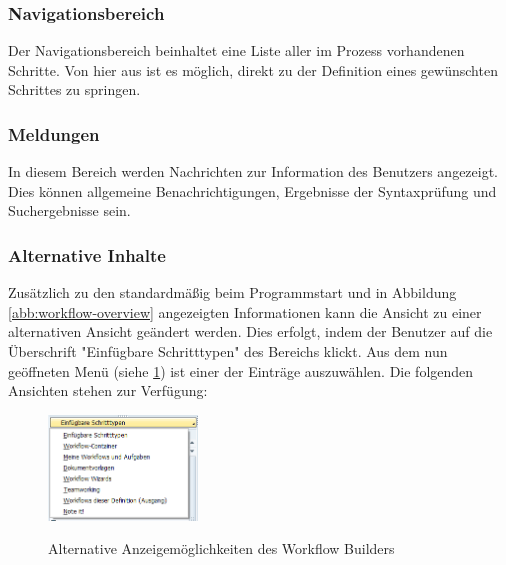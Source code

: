 \subsubsection{Navigationsbereich}
\label{sec:win-overview-information}
Der Navigationsbereich beinhaltet eine Liste aller im Prozess vorhandenen Schritte. Von hier aus ist es möglich, direkt zu der Definition eines gewünschten Schrittes zu springen. 

\subsubsection{Meldungen}
\label{sec:win-overview-meldungen}
In diesem Bereich werden Nachrichten zur Information des Benutzers angezeigt. Dies können allgemeine Benachrichtigungen, Ergebnisse der Syntaxprüfung und Suchergebnisse sein.

\subsubsection{Alternative Inhalte}
\label{sec:win-overview-alternative}
Zusätzlich zu den standardmäßig beim Programmstart und in Abbildung \ref{abb:workflow-overview} angezeigten Informationen kann die Ansicht  zu einer alternativen Ansicht geändert werden. Dies erfolgt, indem der Benutzer auf die Überschrift "Einfügbare Schritttypen" des Bereichs klickt. Aus dem nun geöffneten Menü (siehe \ref{abb:workflow-alternatives}) ist einer der Einträge auszuwählen. Die folgenden Ansichten stehen zur Verfügung:

\begin{figure}[h]
	\begin{center}
	\includegraphics[width=150px]{grafiken/wf-builder_alternative-inhalte.png}
	\caption{Alternative Anzeigemöglichkeiten des Workflow Builders}
	\vspace{-10pt}
	\label{abb:workflow-alternatives}
	\end{center}
\end{figure}

